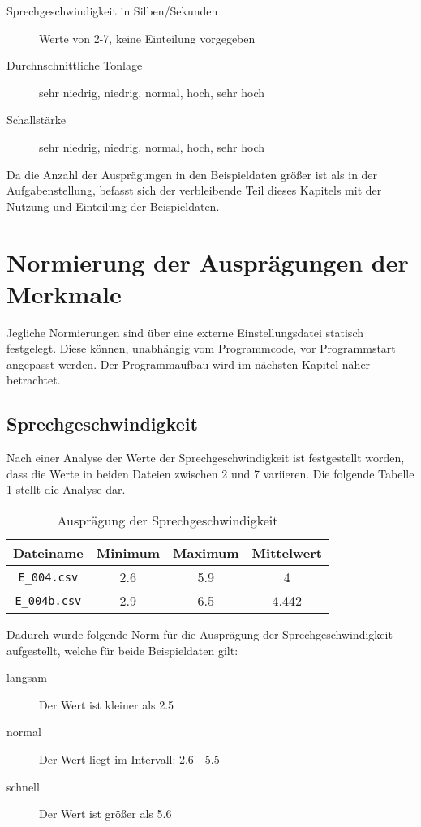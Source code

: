 \begin{description}
  \item [Sprechgeschwindigkeit in Silben/Sekunden] Werte von 2-7, keine Einteilung vorgegeben
  \item [Durchnschnittliche Tonlage] sehr niedrig, niedrig, normal, hoch, sehr hoch
  \item [Schallstärke] sehr niedrig, niedrig, normal, hoch, sehr hoch
\end{description}

Da die Anzahl der Ausprägungen in den Beispieldaten größer ist als in der Aufgabenstellung, befasst sich der verbleibende Teil dieses Kapitels mit der Nutzung und Einteilung der Beispieldaten.

\section{Normierung der Ausprägungen der Merkmale}
Jegliche Normierungen sind über eine externe Einstellungsdatei statisch festgelegt. Diese können, unabhängig vom Programmcode, vor Programmstart angepasst werden. Der Programmaufbau wird im nächsten Kapitel näher betrachtet.

\subsection{Sprechgeschwindigkeit}
\label{sprechgeschwindigkeit_auspr}
Nach einer Analyse der Werte der Sprechgeschwindigkeit ist festgestellt worden, dass die Werte in beiden Dateien zwischen 2 und 7 variieren. Die folgende Tabelle \ref{tab:sprechgeschwdingikeit} stellt die Analyse dar. 

\begin{table}[h]
\begin{tabular}{ c | c | c | c}
  Dateiname & Minimum & Maximum & Mittelwert \\
  \hline 
  \verb|E_004.csv|  & 2.6 & 5.9 & 4 \\
  \verb|E_004b.csv| & 2.9 & 6.5 & 4.442 \\
\end{tabular}
\caption{Ausprägung der Sprechgeschwindigkeit}
\label{tab:sprechgeschwdingikeit}
\end{table}

Dadurch wurde folgende Norm für die Ausprägung der Sprechgeschwindigkeit aufgestellt, welche für beide Beispieldaten gilt:
\begin{description}
  \item [langsam] Der Wert ist kleiner als 2.5
  \item [normal] Der Wert liegt im Intervall: 2.6 - 5.5
  \item [schnell] Der Wert ist größer als 5.6
\end{description}

